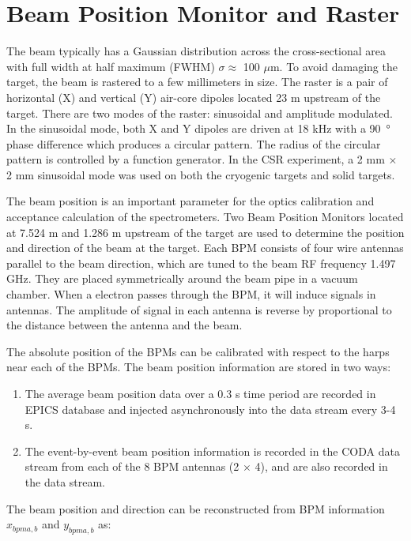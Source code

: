 \section{Beam Position Monitor and Raster}
The beam typically has a Gaussian distribution across the cross-sectional area with full width at half maximum (FWHM)
$\sigma \approx$ 100 $\mu$m. To avoid damaging the target, the beam is rastered to a few millimeters in size. 
The raster is a pair of horizontal (X) and vertical (Y) air-core dipoles located 23 m upstream of the target.
There are two modes of the raster: sinusoidal and amplitude modulated.
In the sinusoidal mode, both X and Y dipoles are driven at 18 kHz with a \SI{90}{\degree} phase difference
which produces a circular pattern. The radius of the circular pattern is controlled by a function generator.
In the CSR experiment, a 2 mm $\times$ 2 mm sinusoidal mode was used on both the cryogenic targets and solid targets.

The beam position is an important parameter for the optics calibration and acceptance calculation of the spectrometers.
Two Beam Position Monitors located at 7.524 m and 1.286 m upstream of the target are used to determine the 
 position and direction of the beam at the target. 
Each BPM consists of four wire antennas parallel to the beam direction, which are tuned to the beam RF frequency 1.497 GHz.
They are placed symmetrically around the beam pipe in a vacuum chamber.
When a electron passes through the BPM, it will induce signals in antennas.
The amplitude of signal in each antenna is reverse by proportional to the distance between the antenna and the beam.

The absolute position of the BPMs can be calibrated with respect to the harps near each of the BPMs.
The beam position information are stored in two ways:

\begin{enumerate}
\item The average beam position data over a 0.3 s time period are recorded in EPICS database and injected asynchronously
into the data stream
every 3-4 s.
\item The event-by-event beam position information is recorded in the CODA data stream from each of the 8 BPM antennas (2
$\times$ 4), and are also recorded in the data stream.
\end{enumerate}

The beam position and direction can be reconstructed from BPM information $x_{bpma,b}$ and $y_{bpma,b}$ as:

